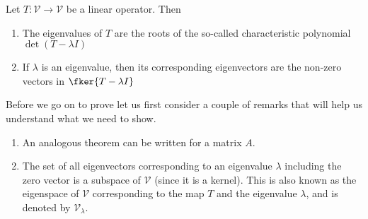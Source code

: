 \begin{thm}\label{thm-eigenvalue-eigenvector}
	Let $T:\mathcal{V}\to\mathcal{V}$ be a linear operator. Then
	\begin{enumerate}
		\item The eigenvalues of $T$ are the roots of the so-called characteristic polynomial $\det(T-\lambda I)$
		\item If $\lambda$ is an eigenvalue, then its corresponding eigenvectors are the non-zero vectors in $\fker{T-\lambda I}$
	\end{enumerate}
\end{thm}

\begin{rem}
	Before we go on to prove  let us
	first consider a couple of remarks that will help us understand what we need
	to show.
	\begin{enumerate}
		\item An analogous theorem can be written for a matrix $A$.
		\item The set of all eigenvectors corresponding to an eigenvalue $\lambda$
		      including the zero vector is a subspace of $\mathcal{V}$ (since it is a
		      kernel). This is also known as the eigenspace of $\mathcal{V}$ corresponding
		      to the map $T$ and the eigenvalue $\lambda$, and is denoted by $\mathcal{V}_\lambda$.
	\end{enumerate}
\end{rem}


